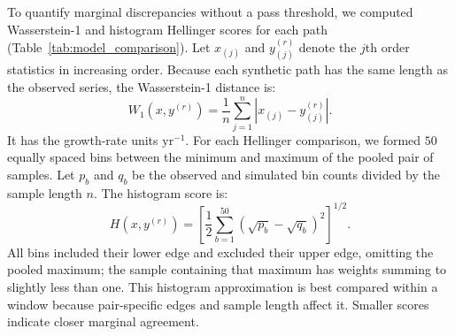 To quantify marginal discrepancies without a pass threshold, we
computed Wasserstein-1 and histogram Hellinger scores for each path
(Table~\ref{tab:model_comparison}). Let $x_{(j)}$ and $y^{(r)}_{(j)}$
denote the $j$th order statistics in increasing order. Because each
synthetic path has the same length as the observed series, the
Wasserstein-1 distance is:
\begin{equation}
 W_1(x,y^{(r)})=\frac{1}{n}\sum_{j=1}^{n}
       |x_{(j)}-y^{(r)}_{(j)}|.
 \label{eq:wasserstein}
\end{equation}
It has the growth-rate units $\mathrm{yr}^{-1}$. For each Hellinger
comparison, we formed $50$ equally spaced bins between the minimum
and maximum of the pooled pair of samples. Let $p_b$ and $q_b$ be
the observed and simulated bin counts divided by the sample length
$n$. The histogram score is:
\begin{equation}
 H(x,y^{(r)})=\left[\frac{1}{2}\sum_{b=1}^{50}
          (\sqrt{p_b}-\sqrt{q_b})^2\right]^{1/2}.
 \label{eq:hellinger}
\end{equation}
All bins included their lower edge and excluded their upper edge, omitting the pooled maximum; the sample containing that maximum has weights summing to slightly less than one. This histogram approximation is best compared within a window because pair-specific edges and sample length affect it. Smaller scores indicate closer marginal agreement.

